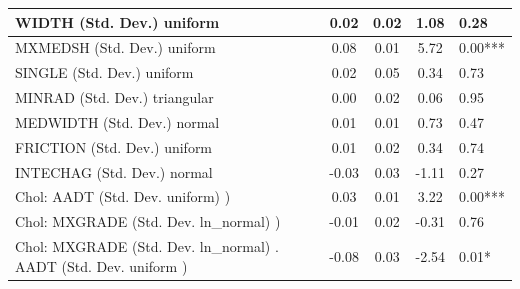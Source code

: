 \begin{table}
\begin{center}
\begin{tabular}{|l|l|c|c|c|l|}
			\hline
			WIDTH (Std. Dev.) uniform &  & 0.02 & 0.02 & 1.08 & 0.28 \\
			\hline
			MXMEDSH (Std. Dev.) uniform &  & 0.08 & 0.01 & 5.72 & 0.00*** \\
			\hline
			SINGLE (Std. Dev.) uniform &  & 0.02 & 0.05 & 0.34 & 0.73 \\
			\hline
			MINRAD (Std. Dev.) triangular &  & 0.00 & 0.02 & 0.06 & 0.95 \\
			\hline
			MEDWIDTH (Std. Dev.) normal &  & 0.01 & 0.01 & 0.73 & 0.47 \\
			\hline
			FRICTION (Std. Dev.) uniform &  & 0.01 & 0.02 & 0.34 & 0.74 \\
			\hline
			INTECHAG (Std. Dev.) normal &  & -0.03 & 0.03 & -1.11 & 0.27 \\
			\hline
			 Chol: AADT (Std. Dev. uniform) ) &  & 0.03 & 0.01 & 3.22 & 0.00*** \\
			\hline
			 Chol: MXGRADE (Std. Dev. ln_normal) ) &  & -0.01 & 0.02 & -0.31 & 0.76 \\
			\hline
			 Chol: MXGRADE (Std. Dev. ln_normal) . AADT (Std. Dev.   uniform ) &  & -0.08 & 0.03 & -2.54 & 0.01* \\
			\hline
		\end{tabular}
	\end{center}
\end{table}